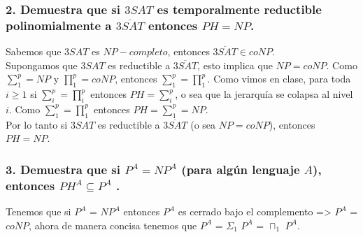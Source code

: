 \documentclass[12pt]{article}
\begin{document}
\subsubsection*{2. Demuestra que si $3SAT$ es temporalmente reductible polinomialmente a $\overline{3SAT}$ entonces $PH = NP$.}
Sabemos que $3SAT$ es $NP-completo$, entonces $\overline{3SAT} \in coNP$. \\
Supongamos que $3SAT$ es reductible a $\overline{3SAT}$, esto implica que $NP = coNP$. Como $\sum_1^p = NP$ y $\prod_1^p = coNP$, entonces $\sum_1^p = \prod_1^p$. Como vimos en clase, para toda $i \geq 1$ si $\sum_i^p = \prod_i^p$ entonces $PH = \sum_i^p$, o sea que la jerarquía se colapsa al nivel $i$. Como $\sum_1^p = \prod_1^p$ entonces $PH = \sum_1^p = NP$. \\
Por lo tanto si $3SAT$ es reductible a $\overline{3SAT}$ (o sea $NP = coNP$), entonces $PH = NP$.

\subsubsection*{3. Demuestra que si $P^A = NP^A$ (para algún lenguaje $A$), entonces $PH^A \subseteq P^A$ .}
Tenemos que si $P^A$ = $NP^A$ entonces $P^A$ es cerrado bajo el complemento => $P^A$ = $coNP$, ahora de manera concisa tenemos que
$P^A$ = $\Sigma_{1}$ $P^A$ = $\sqcap_{1}$ $P^A$. \\
\end{document}
